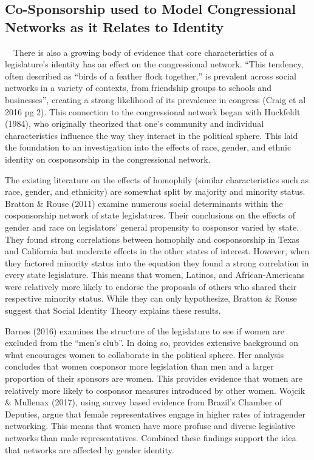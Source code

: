 \documentclass[Royal,times,sageh]{sagej}
\begin{document}
\hypertarget{co-sponsorship-used-to-model-congressional-networks-as-it-relates-to-identity}{%
\subsection{Co-Sponsorship used to Model Congressional Networks as it Relates to Identity}\label{co-sponsorship-used-to-model-congressional-networks-as-it-relates-to-identity}}

~~There is also a growing body of evidence that core characteristics of a legislature's identity has an effect on the congressional network. ``This tendency, often described as ``birds of a feather flock together,'' is prevalent across social networks in a variety of contexts, from friendship groups to schools and businesses'', creating a strong likelihood of its prevalence in congress (Craig et al 2016 pg 2). This connection to the congressional network began with Huckfeldt (1984), who originally theorized that one's community and individual characteristics influence the way they interact in the political sphere. This laid the foundation to an investigation into the effects of race, gender, and ethnic identity on cosponsorship in the congressional network.

The existing literature on the effects of homophily (similar characteristics such as race, gender, and ethnicity) are somewhat split by majority and minority status. Bratton \& Rouse (2011) examine numerous social determinants within the cosponsorship network of state legislatures. Their conclusions on the effects of gender and race on legislators' general propensity to cosponsor varied by state. They found strong correlations between homophily and cosponsorship in Texas and California but moderate effects in the other states of interest. However, when they factored minority status into the equation they found a strong correlation in every state legislature. This means that women, Latinos, and African-Americans were relatively more likely to endorse the proposals of others who shared their respective minority status. While they can only hypothesize, Bratton \& Rouse suggest that Social Identity Theory explains these results.

Barnes (2016) examines the structure of the legislature to see if women are excluded from the ``men's club''. In doing so, provides extensive background on what encourages women to collaborate in the political sphere. Her analysis concludes that women cosponsor more legislation than men and a larger proportion of their sponsors are women. This provides evidence that women are relatively more likely to cosponsor measures introduced by other women. Wojcik \& Mullenax (2017), using survey based evidence from Brazil's Chamber of Deputies, argue that female representatives engage in higher rates of intragender networking. This means that women have more profuse and diverse legislative networks than male representatives. Combined these findings support the idea that networks are affected by gender identity.
\end{document}
